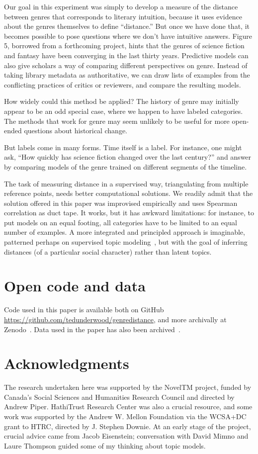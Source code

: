 \documentclass[11pt]{article}
\begin{document}
Our goal in this experiment was simply to develop a measure of the distance between genres that corresponds to literary intuition, because it uses evidence about the genres themselves to define ``distance.'' But once we have done that, it becomes possible to pose questions where we don't have intuitive answers. Figure 5, borrowed from a forthcoming project, hints that the genres of science fiction and fantasy have been converging in the last thirty years. Predictive models can also give scholars a way of comparing different perspectives on genre. Instead of taking library metadata as authoritative, we can draw lists of examples from the conflicting practices of critics or reviewers, and compare the resulting models.

How widely could this method be applied? The history of genre may initially appear to be an odd special case, where we happen to have labeled categories. The methods that work for genre may seem unlikely to be useful for more open-ended questions about historical change. 

But labels come in many forms. Time itself is a label. For instance, one might ask, ``How quickly has science fiction changed over the last century?'' and answer by comparing models of the genre trained on different segments of the timeline.

The task of measuring distance in a supervised way, triangulating from multiple reference points, needs better computational solutions. We readily admit that the solution offered in this paper was improvised empirically and uses Spearman correlation as duct tape. It works, but it has awkward limitations: for instance, to put models on an equal footing, all categories have to be limited to an equal number of examples. A more integrated and principled approach is imaginable, patterned perhaps on supervised topic modeling~\cite{NIPS2008_3599,Zhu09medlda}, but with the goal of inferring distances (of a particular social character) rather than latent topics.

\section{Open code and data}
\label{sec:supplemental}
Code used in this paper is available both on GitHub \url{https://github.com/tedunderwood/genredistance}, and more archivally at Zenodo~\cite{underwood:code}. Data used in the paper has also been archived~\cite{underwood:data}.

\section*{Acknowledgments}

The research undertaken here was supported by the NovelTM project, funded by Canada's Social Sciences and Humanities Research Council and directed by Andrew Piper. HathiTrust Research Center was also a crucial resource, and some work was supported by the Andrew W. Mellon Foundation via the WCSA+DC grant to HTRC, directed by J. Stephen Downie. At an early stage of the project, crucial advice came from Jacob Eisenstein; conversation with David Mimno and Laure Thompson guided some of my thinking about topic models.



\end{document}
